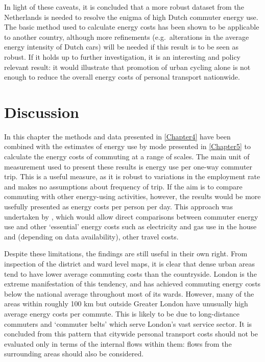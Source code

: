 \documentclass[a4paper, 11pt, twoside]{Thesis}
\begin{document}
In light of these caveats, it is concluded that a 
more robust dataset from the Netherlands is needed to resolve the
enigma of high Dutch commuter energy use. The basic method used to calculate
energy costs has been shown to be applicable to another country,
although more refinements (e.g.~alterations in the average energy
intensity of Dutch cars) will be needed if this result is to be
seen as robust. If it holds up to further investigation, it is an interesting
and policy relevant result: it would illustrate that promotion of urban
cycling alone is not enough to reduce the overall energy costs of personal
transport nationwide.









\section{Discussion}
In this chapter the methods and data presented in
\cref{Chapter4} have been combined with the estimates of energy use by mode presented in
\cref{Chapter5} to calculate the energy costs of commuting at a range of scales.
The main unit of measurement used to present these results is
energy use per one-way commuter trip. This is a useful measure, as it is
robust to variations in the employment rate and makes no assumptions about
frequency of trip. If the aim is to compare commuting with other energy-using
activities, however, the results would be more usefully presented as energy
costs per person per day. This approach was undertaken
by \citet{Boussauw2009}, which would allow
direct comparisons between commuter energy use and other `essential'
energy costs such as electricity and gas use in the house and (depending on
data availability), other travel costs. 

Despite these limitations, the findings are still useful in their own right.
From inspection of the district and ward level maps, it is clear that dense
urban areas tend to have lower average commuting costs than the countryside.
London is the extreme manifestation of this tendency, and has achieved
commuting energy costs below the national average throughout most of its
wards. However, many of the areas within roughly 100 km but outside
Greater London have unusually high  average energy costs per commute.
This is likely to be due to long-distance commuters and `commuter belts'
which serve London's vast service sector. It is concluded from this
pattern that citywide personal transport costs should not be evaluated
only in terms of the internal flows within them: flows from the surrounding
areas should also be considered.
\end{document}
